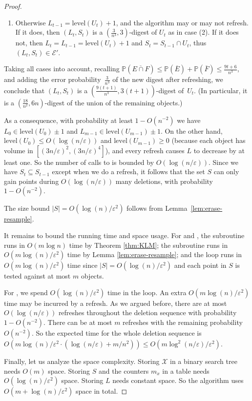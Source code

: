 \documentclass[a4paper, 11pt]{article}
\newcommand{\level}{\mathrm{level}}
\newcommand{\eps}{\varepsilon}
\renewcommand{\Pr}{\mathbb{P}}
\newcommand{\class}[1]{\mathcal{#1}}
\begin{document}
\begin{proof}
\begin{enumerate}[(1)]
        \item Otherwise $L_{t-1} = \level(U_t) + 1$, and the algorithm may or may not refresh. If it does, then $(L_t,S_t)$ is a $(\frac{3}{n^3}, 3)$-digest of $U_t$ as in case (2). If it does not, then $L_t = L_{t-1} = \level(U_t) + 1$ and $S_t = S_{t-1} \cap U_t$, thus $(L_t, S_t) \in \class{E}'$.
    \end{enumerate}
    Taking all cases into account, recalling $\Pr(\overline{E \cap F}) \leq \Pr(\overline{E}) + \Pr(\overline{F}) \leq \frac{9t+6}{n^3}$, and adding the error probability~$\tfrac{3}{n^3}$ of the new digest after refreshing, we conclude that $(L_t, S_t)$ is a $(\frac{9(t+1)}{n^3}, 3(t+1))$-digest of~$U_t$. (In particular, it is a $(\frac{18}{n^2}, 6n)$-digest of the union of the remaining objects.)

    As a consequence, with probability at least $1 - O(n^{-2})$ we have $L_0 \in \level(U_0) \pm 1$ and $L_{m-1} \in \level(U_{m-1}) \pm 1$. On the other hand, $\level(U_0) \leq O(\log(n/\eps))$ and $\level(U_{m-1}) \geq 0$ (because each object has volume in $[(3n/\eps)^2, (3n/\eps)^4]$), and every refresh causes $L$ to decrease by at least one. So the number of calls to  is bounded by $O(\log(n/\eps))$. Since we have $S_t \subseteq S_{t-1}$ except when we do a refresh, it follows that the set $S$ can only gain points during $O(\log(n/\eps))$ many deletions, with probability $1 - O(n^{-2})$.

    The size bound $|S| = O(\log(n)/\eps^2)$ follows from Lemma~\ref{lem:erase-resample}.

    It remains to bound the running time and space usage.
    For \initialize and , the subroutine \KLM runs in $O(m \log n)$ time by Theorem \ref{thm:KLM}; the subroutine \resample runs in $O(m \log (n) / \eps^2)$ time by Lemma \ref{lem:erase-resample}; and the loop runs in $O(m \log(n) / \eps^2)$ time since $|S| = O(\log(n)/\eps^2)$ and each point in $S$ is tested against at most $m$ objects.
  
    For \del, we spend $O(\log (n) / \eps^2)$ time in the loop. An extra $O(m \log (n) / \eps^2)$ time may be incurred by a refresh. As we argued before, there are at most $O(\log(n/\eps))$ refreshes throughout the deletion sequence with probability $1 - O(n^{-2})$. There can be at most $m$ refreshes with the remaining probability $O(n^{-2})$. So the expected time for the whole deletion sequence is $O(m \log(n) / \eps^2 \cdot (\log(n/\eps) + m/n^2)) \leq O(m \log^2(n/\eps)/\eps^2)$.

    Finally, let us analyze the space complexity. Storing $\class{X}$ in a binary search tree needs $O(m)$ space. Storing $S$ and the counters $m_x$ in a table needs $O(\log(n)/\eps^2)$ space. Storing $L$ needs constant space. So the algorithm uses $O(m + \log(n)/\eps^2)$ space in total.
\end{proof}
\end{document}
